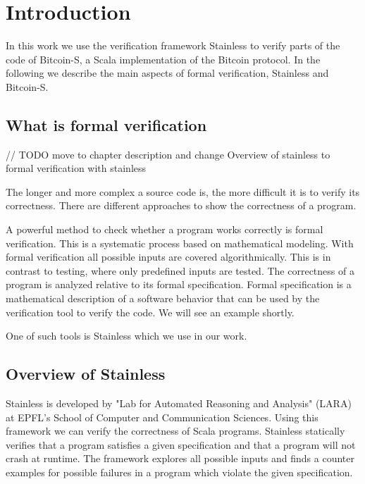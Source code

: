 \chapter{Introduction}
\label{chap:introduction}

In this work we use the verification framework Stainless to verify parts of the code of Bitcoin-S, a Scala implementation of the Bitcoin protocol.
In the following we describe the main aspects of formal verification, Stainless and Bitcoin-S.


\section{What is formal verification}
\label{sec:formal_verification}

// TODO move to chapter description and change Overview of stainless to formal verification with stainless

The longer and more complex a source code is, the more difficult it is to verify its correctness.
There are different approaches to show the correctness of a program.

A powerful method to check whether a program works correctly is formal verification.
This is a systematic process based on mathematical modeling.
With formal verification all possible inputs are covered algorithmically.
This is in contrast to testing, where only predefined inputs are tested.
The correctness of a program is analyzed relative to its formal specification.
Formal specification is a mathematical description of a software behavior that can be used by the verification tool to verify the code.
We will see an example shortly.

One of such tools is Stainless which we use in our work.


\section{Overview of Stainless}
\label{sec:stainless}

Stainless is developed by "Lab for Automated Reasoning and Analysis" (LARA) at EPFL's School of Computer and Communication Sciences.
Using this framework we can verify the correctness of Scala programs.
Stainless statically verifies that a program satisfies a given specification and that a program will not crash at runtime.
The framework explores all possible inputs and finds a counter examples for possible failures in a program which violate the given specification. \cite{Stainless:introduction}

